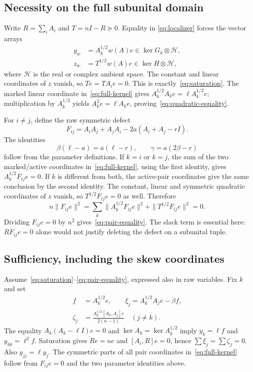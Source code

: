 \documentclass[11pt]{article}
\begin{document}
\subsection{Necessity on the full subunital domain}
Write $R=\sum_iA_i$ and $T=nI-R\succeq0$. Equality in
\eqref{eq:localizer} forces the vector arrays
\begin{align}
 y_w&=A_k^{1/2}w(A)e\in\ker G_k\otimes\mathcal H,\nonumber\\
 z_w&=T^{1/2}w(A)e\in\ker H\otimes\mathcal H,
 \label{eq:localizer-kernel-vectors}
\end{align}
where $\mathcal H$ is the real or complex ambient space.
The constant and linear coordinates of $z$ vanish, so
$Te=TA_i e=0$. This is exactly~\eqref{eq:saturation}.
The marked linear coordinate in~\eqref{eq:full-kernel} gives
$A_k^{1/2}A_k e=\ell A_k^{1/2}e$; multiplication by $A_k^{1/2}$
yields $A_k^2e=\ell A_ke$, proving~\eqref{eq:quadratic-equality}.

For $i\ne j$, define the raw symmetric defect
\[
 F_{ij}=A_iA_j+A_jA_i-2a(A_i+A_j-rI).
\]
The identities
\[
 \beta(\ell-a)=a(\ell-r),\qquad \gamma=a(2\beta-r)
\]
follow from the parameter definitions. If $k=i$ or $k=j$, the sum
of the two marked/active coordinates in~\eqref{eq:full-kernel},
using the first identity, gives $A_k^{1/2}F_{ij}e=0$.
If $k$ is different from both, the active-pair coordinates give the
same conclusion by the second identity. The constant, linear and
symmetric quadratic coordinates of $z$ vanish, so
$T^{1/2}F_{ij}e=0$ as well. Therefore
\[
 n\|F_{ij}e\|^2
 =\sum_k\|A_k^{1/2}F_{ij}e\|^2+\|T^{1/2}F_{ij}e\|^2=0.
\]
Dividing $F_{ij}e=0$ by $n^2$ gives~\eqref{eq:pair-equality}.
The slack term is essential here: $RF_{ij}e=0$ alone would not
justify deleting the defect on a subunital tuple.

\subsection{Sufficiency, including the skew coordinates}
Assume~\eqref{eq:saturation}--\eqref{eq:pair-equality}, expressed
also in raw variables. Fix $k$ and set
\begin{align*}
 f&=A_k^{1/2}e,\qquad
 \xi_j=A_k^{1/2}A_je-\beta f,\\
 \zeta_j&=\frac{A_k^{1/2}[A_k,A_j]e}{2(n-1)}\quad(j\ne k).
\end{align*}
The equality $A_k(A_k-\ell I)e=0$ and
$\ker A_k=\ker A_k^{1/2}$ imply $y_k=\ell f$ and
$y_{kk}=\ell^2f$. Saturation gives $Re=ne$ and
$[A_i,R]e=0$, hence $\sum\xi_j=\sum\zeta_j=0$.
Also $y_{jj}=\ell y_j$. The symmetric parts of all pair coordinates
in~\eqref{eq:full-kernel} follow from $F_{ij}e=0$ and the two
parameter identities above.
\end{document}
